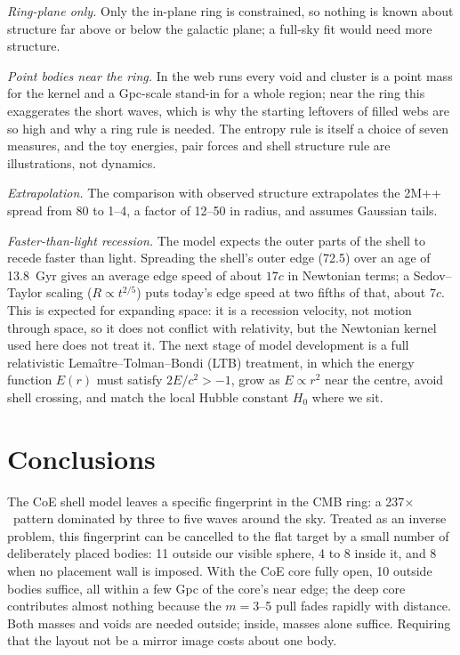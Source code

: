 \documentclass[aps,prd,twocolumn,nofootinbib,superscriptaddress,floatfix]{revtex4-2}
\newcommand{\fl}{\ensuremath{\times}}
\begin{document}
\emph{Ring-plane only.} Only the in-plane ring is constrained, so nothing is known about structure far above or below the galactic plane; a full-sky fit would need more structure.

\emph{Point bodies near the ring.} In the web runs every void and cluster is a point mass for the kernel and a Gpc-scale stand-in for a whole region; near the ring this exaggerates the short waves, which is why the starting leftovers of filled webs are so high and why a ring rule is needed. The entropy rule is itself a choice of seven measures, and the toy energies, pair forces and shell structure rule are illustrations, not dynamics.

\emph{Extrapolation.} The comparison with observed structure extrapolates the 2M++ spread from \SI{80}{\Mpc} to \SIrange{1}{4}{\Gpc}, a factor of 12--50 in radius, and assumes Gaussian tails.

\emph{Faster-than-light recession.} The model expects the outer parts of the shell to recede faster than light. Spreading the shell's outer edge (\SI{72.5}{\Gpc}) over an age of \SI{13.8}{Gyr} gives an average edge speed of about $17c$ in Newtonian terms; a Sedov--Taylor scaling ($R\propto t^{2/5}$) puts today's edge speed at two fifths of that, about $7c$. This is expected for expanding space: it is a recession velocity, not motion through space, so it does not conflict with relativity, but the Newtonian kernel used here does not treat it. The next stage of model development is a full relativistic Lema\^itre--Tolman--Bondi (LTB) treatment, in which the energy function $E(r)$ must satisfy $2E/c^2>-1$, grow as $E\propto r^2$ near the centre, avoid shell crossing, and match the local Hubble constant $H_0$ where we sit.

\section{Conclusions}
The CoE shell model leaves a specific fingerprint in the CMB ring: a 237\fl\ pattern dominated by three to five waves around the sky. Treated as an inverse problem, this fingerprint can be cancelled to the flat target by a small number of deliberately placed bodies: 11 outside our visible sphere, 4 to 8 inside it, and 8 when no placement wall is imposed. With the CoE core fully open, 10 outside bodies suffice, all within a few Gpc of the core's near edge; the deep core contributes almost nothing because the $m=3$--5 pull fades rapidly with distance. Both masses and voids are needed outside; inside, masses alone suffice. Requiring that the layout not be a mirror image costs about one body.
\end{document}
